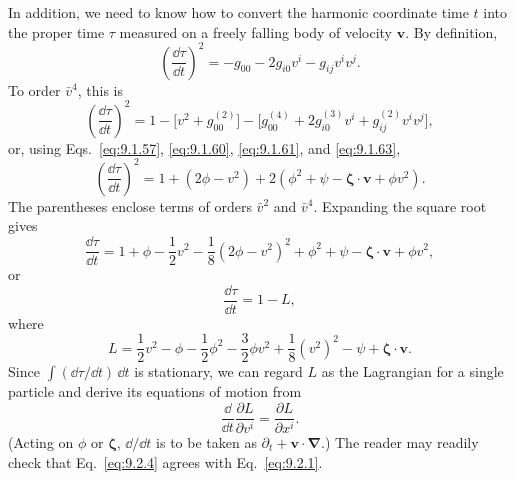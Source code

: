 In addition, we need to know how to convert the harmonic coordinate time
\(t\) into the proper time \(\tau\) measured on a freely falling body of
velocity \(\mathbf v\). By definition,
\[
  \left(\frac{\dd\tau}{\dd t}\right)^2
  =-g_{00}-2g_{i0}v^i-g_{ij}v^iv^j.
\]
To order \(\bar v^4\), this is
\[
  \left(\frac{\dd\tau}{\dd t}\right)^2
  =
  1-\bigl[v^2+g_{00}^{(2)}\bigr]
  -\bigl[g_{00}^{(4)}+2g_{i0}^{(3)}v^i
          +g_{ij}^{(2)}v^iv^j\bigr],
\]
or, using Eqs.~\eqref{eq:9.1.57}, \eqref{eq:9.1.60},
\eqref{eq:9.1.61}, and \eqref{eq:9.1.63},
\[
  \left(\frac{\dd\tau}{\dd t}\right)^2
  =
  1+(2\phi-v^2)
  +2(\phi^2+\psi-\boldsymbol\zeta\cdot\mathbf v+\phi v^2).
\]
The parentheses enclose terms of orders \(\bar v^2\) and \(\bar v^4\).
Expanding the square root gives
\[
  \frac{\dd\tau}{\dd t}
  =
  1+\phi-\frac12v^2-\frac18(2\phi-v^2)^2
  +\phi^2+\psi-\boldsymbol\zeta\cdot\mathbf v+\phi v^2,
\]
or
\begin{equation}
  \frac{\dd\tau}{\dd t}=1-L,
  \tag{9.2.2}\label{eq:9.2.2}
\end{equation}
where
\begin{equation}
  L
  =
  \frac12v^2-\phi-\frac12\phi^2-\frac32\phi v^2
  +\frac18(v^2)^2-\psi+\boldsymbol\zeta\cdot\mathbf v.
  \tag{9.2.3}\label{eq:9.2.3}
\end{equation}
Since \(\int(\dd\tau/\dd t)\,\dd t\) is stationary, we can regard \(L\) as
the Lagrangian for a single particle and derive its equations of motion from
\begin{equation}
  \frac{\dd}{\dd t}\frac{\partial L}{\partial v^i}
  =
  \frac{\partial L}{\partial x^i}.
  \tag{9.2.4}\label{eq:9.2.4}
\end{equation}
(Acting on \(\phi\) or \(\boldsymbol\zeta\),
\(\dd/\dd t\) is to be taken as
\(\partial_t+\mathbf v\cdot\boldsymbol\nabla\).) The reader may readily
check that Eq.~\eqref{eq:9.2.4} agrees with Eq.~\eqref{eq:9.2.1}.

